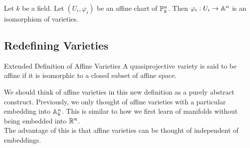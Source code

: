\documentclass[a4paper]{article}
\begin{document}
\begin{prp}{}{} Let $k$ be a field. Let $(U_i,\varphi_i)$ be an affine chart of $\mathbb{P}_k^n$. Then $\varphi_i:U_i\to\mathbb{A}^n$ is an isomorphism of varieties. 
\end{prp}

\subsection{Redefining Varieties}
\begin{defn}{Extended Definition of Affine Varieties}{} A quasiprojective variety is said to be affine if it is isomorphic to a closed subset of affine space. 
\end{defn}

We should think of affine varieties in this new definition as a purely abstract construct. Previously, we only thought of affine varieties with a particular embedding into $\mathbb{A}_k^n$. This is similar to how we first learn of manifolds without being embedded into $\mathbb{R}^n$. \\

The advantage of this is that affine varieties can be thought of independent of embeddings. 
\end{document}
